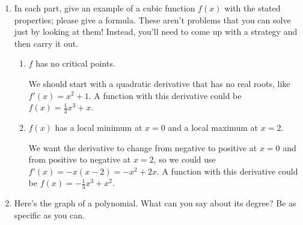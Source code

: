\documentclass{article}
\begin{document}
\begin{enumerate}[resume, topsep=0pt]
\item 


  In each part, give an example of a cubic function $f(x)$ with the stated properties; please give a formula. These aren't problems that you can solve just by looking at them! Instead, you'll need to come up with a strategy and then carry it out.

  \begin{enumerate}
  \item
    \begin{problem}[\vfill]
      $f$ has no critical points.
    \end{problem}

    \begin{solution}
      We should start with a quadratic derivative that has no real roots,
      like $f'(x)=x^2+1$. A function with this derivative could be
      $f(x)=\frac{1}{3}x^3+x$.
    \end{solution}

  \item

    \begin{problem}[\stretch{1.25}]
      $f(x)$ has a local minimum at $x = 0$ and a local maximum at $x = 2$.
    \end{problem}

    \begin{solution}
      We want the derivative to change from negative to positive
      at $x=0$ and from positive to negative at $x=2$, so we could
      use $f'(x)=-x(x-2)=-x^2+2x$. A function with this derivative
      could be $f(x)=-\frac{1}{3}x^3 +x^2$.
    \end{solution}

  \end{enumerate}

\item 


  \begin{problem}[\newpage]
    Here's the graph of a polynomial. What can you say about its degree? Be as specific as you can. 

  \end{problem}


\end{enumerate}
\end{document}
